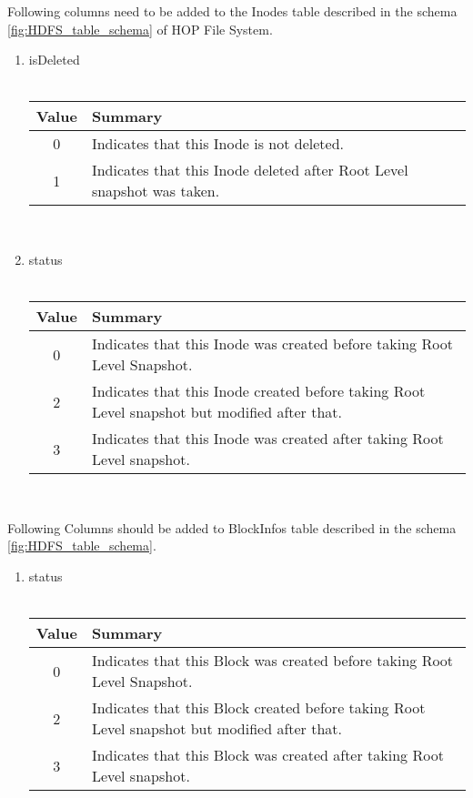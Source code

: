 Following columns need to be added to the Inodes table described in the schema \ref{fig:HDFS_table_schema} of HOP File System.
\begin{enumerate}
\item isDeleted \\\\
\begin{tabular}{|c|p{15cm}|}
\hline
Value&Summary\\
\hline
0&Indicates that this Inode is not deleted.\\
\hline
1&Indicates that this Inode deleted after Root Level snapshot was taken.\\ 
\hline
\end{tabular} \\
\item status \\\\
\begin{tabular}{|c|p{15cm}|}
\hline
Value&Summary\\
\hline
0&Indicates that this Inode was created before taking Root Level Snapshot.\\
\hline
2&Indicates that this Inode created before taking Root Level snapshot but modified after that.\\ 
\hline
3&Indicates that this Inode was created after taking Root Level snapshot.\\ 
\hline
\end{tabular} \\

\end{enumerate}
\pagebreak

Following Columns should be added to BlockInfos table described in the schema \ref{fig:HDFS_table_schema}.
\begin{enumerate}
\item status \\\\
\begin{tabular}{|c|p{15cm}|}
\hline
Value&Summary\\
\hline
0&Indicates that this Block was created before taking Root Level Snapshot.\\
\hline
2&Indicates that this Block created before taking Root Level snapshot but modified after that.\\ 
\hline
3&Indicates that this Block was created after taking Root Level snapshot.\\ 
\hline
\end{tabular} \\
\end{enumerate}






